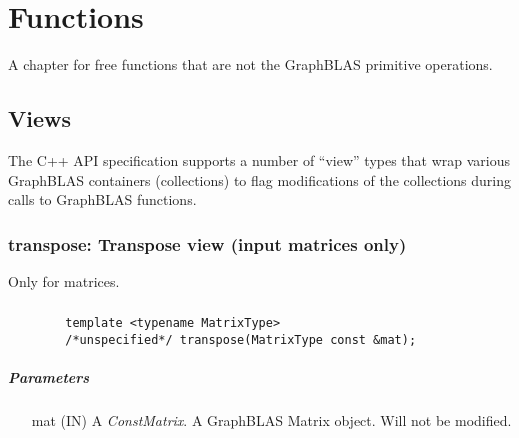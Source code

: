 \chapter{Functions}
\label{Chp:Functions}

A chapter for free functions that are not the GraphBLAS primitive operations.

\section{Views}

The C++ API specification supports a number of ``view'' types that wrap various
GraphBLAS containers (collections) to flag modifications of the collections
during calls to GraphBLAS functions.

\subsection{{\sf transpose}: Transpose view (input matrices only)}

Only for matrices.  

\paragraph{\syntax}

\begin{verbatim}
        template <typename MatrixType>
        /*unspecified*/ transpose(MatrixType const &mat);
\end{verbatim}


\paragraph{Parameters}

\begin{itemize}%
    \item[{\sf mat}] ({\sf IN}) A \emph{ConstMatrix}. A GraphBLAS Matrix object.  Will not be modified.
\end{itemize}

